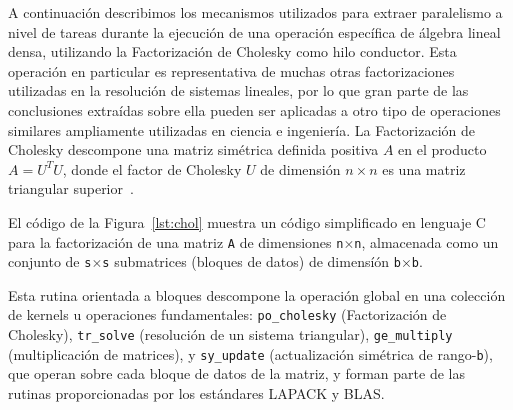A continuación describimos los mecanismos utilizados para extraer paralelismo a nivel de tareas
durante la ejecución de una operación específica de álgebra lineal densa, utilizando la Factorización
de Cholesky como hilo conductor. Esta operación en particular es representativa de muchas
otras factorizaciones utilizadas en la resolución de sistemas lineales, por lo que gran parte de las
conclusiones extraídas sobre ella pueden ser aplicadas a otro tipo de operaciones similares ampliamente
utilizadas en ciencia e ingeniería.
%
La Factorización de Cholesky descompone una matriz simétrica definida positiva
$A$ en el producto $A=U^TU$, donde el factor de Cholesky $U$ de dimensión $n \times n$ es una matriz triangular
superior~\cite{GVL3}. 



El código de la Figura~\ref{lst:chol} muestra un código simplificado en lenguaje C para
la factorización de una matriz {\tt A} de dimensiones {\tt n}$\times${\tt n}, 
almacenada como un conjunto de {\tt s}$\times${\tt s} submatrices (bloques de datos) de dimensíón 
{\tt b}$\times${\tt b}.

Esta rutina orientada a bloques descompone la operación global en una colección de kernels u operaciones
fundamentales:
{\tt po\_cholesky} (Factorización de Cholesky), {\tt tr\_solve} (resolución de un sistema triangular),
{\tt ge\_multiply} (multiplicación de matrices), y 
{\tt sy\_update} (actualización simétrica de rango-{\tt b}), que operan sobre cada bloque
de datos de la matriz, y forman parte de las rutinas proporcionadas por los estándares LAPACK y BLAS. 

